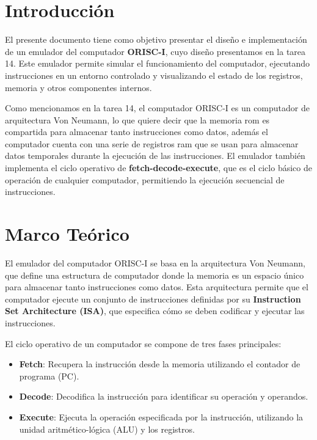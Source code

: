 \documentclass{article}
\begin{document}
\section{Introducción}\label{sec:intr}

El presente documento tiene como objetivo presentar el diseño e implementación de un emulador
del computador \textbf{ORISC-I}, cuyo diseño presentamos en la tarea 14. Este emulador permite simular el funcionamiento del computador, ejecutando instrucciones en un entorno controlado y visualizando el estado de los registros, memoria y otros componentes internos.

Como mencionamos en la tarea 14, el computador ORISC-I es un computador de arquitectura Von Neumann, lo que quiere decir que la memoria rom es compartida para almacenar tanto instrucciones como datos, además el computador cuenta con una serie de registros ram que se usan para almacenar datos temporales durante la ejecución de las instrucciones. El emulador también implementa el ciclo operativo de \textbf{fetch-decode-execute}, que es el ciclo básico de operación de cualquier computador, permitiendo la ejecución secuencial de instrucciones.


\section{Marco Teórico}\label{sec:marc}

El emulador del computador ORISC-I se basa en la arquitectura Von Neumann, que define una estructura de computador donde la memoria es un espacio único para almacenar tanto instrucciones como datos. Esta arquitectura permite que el computador ejecute un conjunto de instrucciones definidas por su \textbf{Instruction Set Architecture (ISA)}, que especifica cómo se deben codificar y ejecutar las instrucciones.

El ciclo operativo de un computador se compone de tres fases principales:
\begin{itemize}
  \item \textbf{Fetch}: Recupera la instrucción desde la memoria utilizando el contador de programa (PC).
  \item \textbf{Decode}: Decodifica la instrucción para identificar su operación y operandos.
  \item \textbf{Execute}: Ejecuta la operación especificada por la instrucción, utilizando la unidad aritmético-lógica (ALU) y los registros.
\end{itemize}
\end{document}

